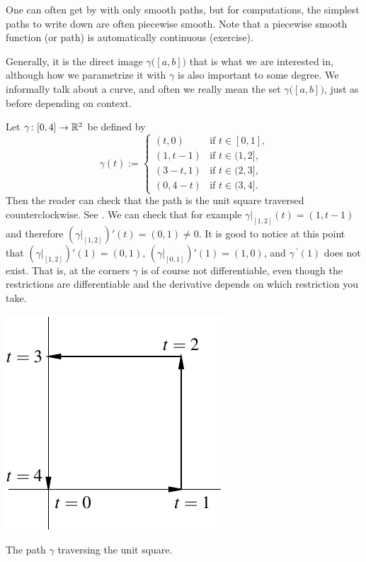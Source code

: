 One can often get by with only smooth paths, but for computations, the simplest
paths to write down are often piecewise smooth.
Note that a piecewise smooth function (or path) is automatically continuous (exercise).

Generally, it is the direct image $\gamma\bigl([a,b]\bigr)$ that is what we are
interested in, although how we parametrize it with $\gamma$ is also
important to some degree.  We informally talk about a curve, and often
we really mean the set $\gamma\bigl([a,b]\bigr)$, just as before depending
on context.

\begin{example} \label{mv:example:unitsquarepath}
Let $\gamma \colon [0,4] \to {\mathbb{R}}^2$ be defined by
\begin{equation*}
\gamma(t) :=
\begin{cases}
(t,0) & \text{if $t \in [0,1]$,}\\
(1,t-1) & \text{if $t \in (1,2]$,}\\
(3-t,1) & \text{if $t \in (2,3]$,}\\
(0,4-t) & \text{if $t \in (3,4]$.}
\end{cases}
\end{equation*}
Then the reader can check that the path is the unit square traversed
counterclockwise.  See .  We can check that for example
$\gamma|_{[1,2]}(t) = (1,t-1)$ and therefore
$(\gamma|_{[1,2]})'(t) = (0,1) \not= 0$.  It is good to notice at this point
that
$(\gamma|_{[1,2]})'(1) = (0,1)$,
$(\gamma|_{[0,1]})'(1) = (1,0)$, and
$\gamma^{\:\prime}(1)$ does not exist.  That is, at the corners $\gamma$ is of course
not differentiable, even though the restrictions are differentiable and the
derivative depends on which restriction you take.
\begin{myfigureht}
\includegraphics{figures/squarepath}
\caption{The path $\gamma$ traversing the unit square.\label{fig:squarepath}}
\end{myfigureht}
\end{example}

